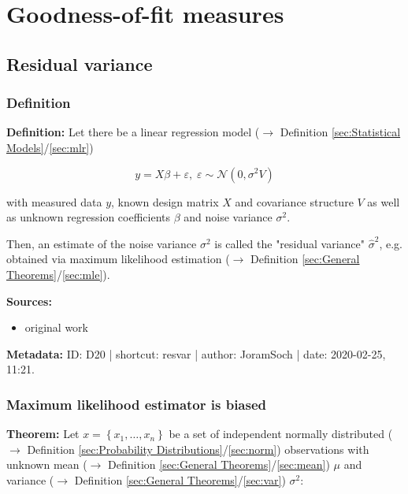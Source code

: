 \documentclass[a4paper,12pt,twoside]{book}
\begin{document}
\pagebreak
\section{Goodness-of-fit measures}

\subsection{Residual variance}

\subsubsection[\textit{Definition}]{Definition} \label{sec:resvar}
\setcounter{equation}{0}

\textbf{Definition:} Let there be a linear regression model ($\rightarrow$ Definition \ref{sec:Statistical Models}/\ref{sec:mlr})

\begin{equation} \label{eq:resvar-mlr}
y = X\beta + \varepsilon, \; \varepsilon \sim \mathcal{N}(0, \sigma^2 V)
\end{equation}

with measured data $y$, known design matrix $X$ and covariance structure $V$ as well as unknown regression coefficients $\beta$ and noise variance $\sigma^2$.

Then, an estimate of the noise variance $\sigma^2$ is called the "residual variance" $\hat{\sigma}^2$, e.g. obtained via maximum likelihood estimation ($\rightarrow$ Definition \ref{sec:General Theorems}/\ref{sec:mle}).


\vspace{1em}
\textbf{Sources:}
\begin{itemize}
\item original work\end{itemize}


\vspace{1em}
\textbf{Metadata:} ID: D20 | shortcut: resvar | author: JoramSoch | date: 2020-02-25, 11:21.
\vspace{1em}



\subsubsection[\textbf{Maximum likelihood estimator is biased}]{Maximum likelihood estimator is biased} \label{sec:resvar-bias}
\setcounter{equation}{0}

\textbf{Theorem:} Let $x = \left\lbrace x_1, \ldots, x_n \right\rbrace$ be a set of independent normally distributed ($\rightarrow$ Definition \ref{sec:Probability Distributions}/\ref{sec:norm}) observations with unknown mean ($\rightarrow$ Definition \ref{sec:General Theorems}/\ref{sec:mean}) $\mu$ and variance ($\rightarrow$ Definition \ref{sec:General Theorems}/\ref{sec:var}) $\sigma^2$:
\end{document}
